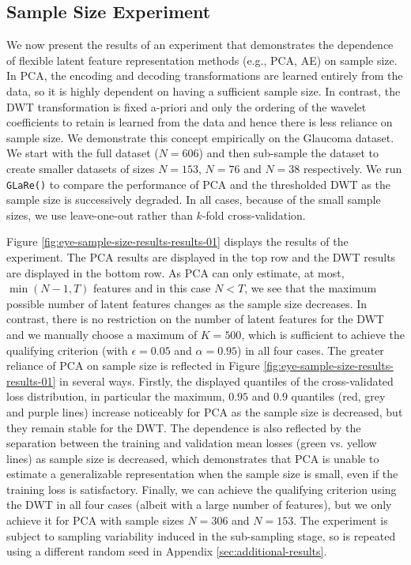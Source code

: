 \subsection{Sample Size Experiment}\label{sec:sample-size-experiment}

We now present the results of an experiment that demonstrates the dependence of flexible latent feature representation methods (e.g., PCA, AE) on sample size.
In PCA, the encoding and decoding transformations are learned entirely from the data, so it is highly dependent on having a sufficient sample size.
In contrast, the DWT transformation is fixed a-priori and only the ordering of the wavelet coefficients to retain is learned from the data and hence there is less reliance on sample size.
We demonstrate this concept empirically on the Glaucoma dataset. 
We start with the full dataset ($N=606$) and then sub-sample the dataset to create smaller datasets of sizes $N=153$, $N=76$ and $N=38$ respectively.
We run \texttt{GLaRe()} to compare the performance of PCA and the thresholded DWT as the sample size is successively degraded.
In all cases, because of the small sample sizes, we use leave-one-out rather than $k$-fold cross-validation.

Figure \ref{fig:eye-sample-size-results-results-01} displays the results of the experiment.
The PCA results are displayed in the top row and the DWT results are displayed in the bottom row.
As PCA can only estimate, at most, $\min(N-1, T)$ features and in this case $N<T$, we see that the maximum possible number of latent features changes as the sample size decreases.
In contrast, there is no restriction on the number of latent features for the DWT and we manually choose a maximum of $K=500$, which is sufficient to achieve the qualifying criterion (with $\epsilon=0.05$ and $\alpha=0.95$) in all four cases.
The greater reliance of PCA on sample size is reflected in Figure \ref{fig:eye-sample-size-results-results-01} in several ways.
Firstly, the displayed quantiles of the cross-validated loss distribution, in particular the maximum, $0.95$ and $0.9$ quantiles (red, grey and purple lines) increase noticeably for PCA as the sample size is decreased, but they remain stable for the DWT.
The dependence is also reflected by the separation between the training and validation mean losses (green vs. yellow lines) as sample size is decreased, which demonstrates that PCA is unable to estimate a generalizable representation when the sample size is small, even if the training loss is satisfactory.
Finally, we can achieve the qualifying criterion using the DWT in all four cases (albeit with a large number of features), but we only achieve it for PCA with sample sizes $N=306$ and $N=153$.
The experiment is subject to sampling variability induced in the sub-sampling stage, so is repeated using a different random seed in Appendix \ref{sec:additional-results}.

